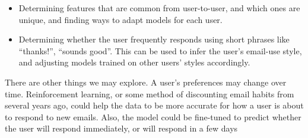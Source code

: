\documentclass{article}
\begin{document}
\begin{itemize}
\item Determining features that are common from user-to-user, and which ones are unique, and finding ways to adapt models for each user.
\item Determining whether the user frequently responds using short phrases like ``thanks!'', ``sounds good''. This can be used to infer the user's email-use style, and adjusting models trained on other users' styles accordingly.
\end{itemize}

There are other things we may explore. A user's preferences may change over time. Reinforcement learning, or some method of discounting email habits from several years ago, could help the data to be more accurate for how a user is about to respond to new emails. Also, the model could be fine-tuned to predict whether the user will respond immediately, or will respond in a few days

 

\end{document}
